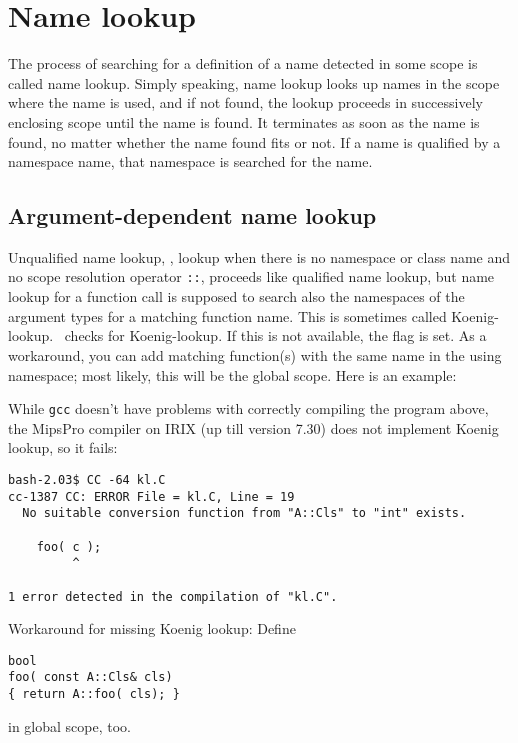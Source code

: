 \section{Name lookup}
The process of searching for a definition of a name detected in
some scope is called name lookup.
Simply speaking, name lookup looks 
up names in the scope where the name is used, 
and if not found, the lookup proceeds in successively enclosing scope 
until the name is found. It terminates as soon as the name is found, no
matter whether the name found fits or not.
If a name is qualified by a namespace name, that namespace is searched
for the name.

\subsection{Argument-dependent name lookup}
%
Unqualified name lookup, \ie, lookup when there is no namespace or class
name and no scope resolution%
 operator \verb+::+, proceeds like qualified 
name lookup, but name lookup for a function call is supposed to search also 
the namespaces of the argument types for a matching function name. 
This is sometimes called Koenig-lookup.
\cgal\ checks for Koenig-lookup. If this is not available, 
the flag %
is set. As a workaround,
you can add matching function(s) with the same name in the using namespace; 
most likely, this will be the global scope.
Here is an example:


While \verb+gcc+ doesn't have problems with correctly compiling the program
above, the MipsPro compiler on {\sc IRIX} (up till version 7.30) does not
implement Koenig lookup, so it fails:

{\small
\begin{verbatim}
bash-2.03$ CC -64 kl.C  
cc-1387 CC: ERROR File = kl.C, Line = 19
  No suitable conversion function from "A::Cls" to "int" exists.

    foo( c );
         ^

1 error detected in the compilation of "kl.C".
\end{verbatim}

}
Workaround for missing Koenig lookup:
Define 
\begin{verbatim}
bool
foo( const A::Cls& cls)
{ return A::foo( cls); }
\end{verbatim}
in global scope, too.


